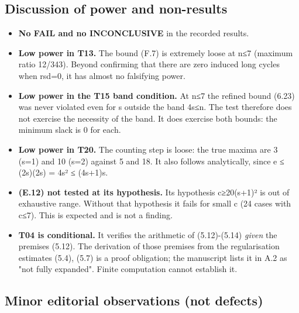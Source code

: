 \documentclass[
]{article}
\providecommand{\tightlist}{%
  \setlength{\itemsep}{0pt}\setlength{\parskip}{0pt}}
\begin{document}
\subsection{Discussion of power and
non-results}\label{discussion-of-power-and-non-results}

\begin{itemize}
\tightlist
\item
  \textbf{No FAIL and no INCONCLUSIVE} in the recorded results.
\item
  \textbf{Low power in T13.} The bound (F.7) is extremely loose at n≤7
  (maximum ratio 12/343). Beyond confirming that there are zero induced
  long cycles when rsd=0, it has almost no falsifying power.
\item
  \textbf{Low power in the T15 band condition.} At n≤7 the refined bound
  (6.23) was never violated even for s outside the band 4s≤n. The test
  therefore does not exercise the necessity of the band. It does
  exercise both bounds: the minimum slack is 0 for each.
\item
  \textbf{Low power in T20.} The counting step is loose: the true maxima
  are 3 (s=1) and 10 (s=2) against 5 and 18. It also follows
  analytically, since e ≤ (2s)(2s) = 4s² ≤ (4s+1)s.
\item
  \textbf{(E.12) not tested at its hypothesis.} Its hypothesis
  c≥20(s+1)² is out of exhaustive range. Without that hypothesis it
  fails for small c (24 cases with c≤7). This is expected and is not a
  finding.
\item
  \textbf{T04 is conditional.} It verifies the arithmetic of
  (5.12)-(5.14) \emph{given} the premises (5.12). The derivation of
  those premises from the regularisation estimates (5.4), (5.7) is a
  proof obligation; the manuscript lists it in A.2 as "not fully
  expanded". Finite computation cannot establish it.
\end{itemize}

\subsection{Minor editorial observations (not
defects)}\label{minor-editorial-observations-not-defects}
\end{document}
